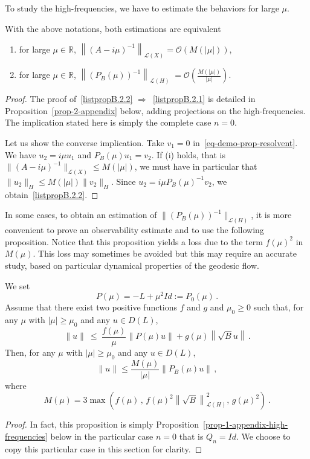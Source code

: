 \documentclass[10pt]{amsart}
\theoremstyle{definition}\newtheorem{defi}[theo]{Definition}\newtheorem{rema}[theo]{Remark}\newtheorem{exam}[theo]{Example}\newtheorem{exem}[theo]{Example}\newtheorem{nota}[theo]{Notation}
\newcommand{\RR}{\mathbb{R}}
\newcommand{\Lc}{\mathcal{L}}
\newcommand{\Oc}{\mathcal{O}}
\newcommand*{\romanenumi}{\renewcommand*{\theenumi}{\roman{enumi}}}
\begin{document}
To study the high-frequencies, we have to estimate the behaviors for large $\mu$.

\begin{prop}\label{prop-estimP}
With the above notations, both estimations are equivalent
\begin{enumerate}\romanenumi
\item \label{listpropB.2.1}for large $\mu\in\RR$, $\left\|(A-i\mu)^{-1}\right\|_{\Lc(X)} = \Oc (M(|\mu|))$,
\item \label{listpropB.2.2}for large $\mu\in\RR$, $\left\|(P_B(\mu))^{-1}\right\|_{\Lc(H)}\;= \Oc(
\frac{M(|\mu|)}{|\mu|})$.
\end{enumerate}
\end{prop}
\begin{proof}
The proof of~\eqref{listpropB.2.2} $\Rightarrow$~\eqref{listpropB.2.1} is detailed in Proposition~\ref{prop-2-appendix} below, adding projections on the high-frequencies. The implication stated here is simply the complete case $n=0$.

Let us show the converse implication. Take $v_1=0$ in~\eqref{eq-demo-prop-resolvent}. We have $u_2=i\mu u_1$ and $P_B(\mu)u_1 = v_2$. If (i) holds, that is $\|(A - i\mu)^{-1}\|_{\Lc(X)}\leq M(|\mu|)$, we must have in particular that $\|u_2\|_{H}\leq M(|\mu|)\|v_2\|_{H}$. Since $u_2=i\mu P_B(\mu)^{-1} v_2$, we obtain~\eqref{listpropB.2.2}.
\end{proof}


In some cases, to obtain an estimation of $\|(P_B(\mu))^{-1}\|_{\Lc(H)}$, it is more convenient to prove an observability estimate and to use the following proposition. Notice that this proposition yields a loss due to the term $f(\mu)^2$ in $M(\mu)$. This loss may sometimes be avoided but this may require an accurate study, based on particular dynamical properties of the geodesic flow.

\begin{prop}\label{prop-1-appendix}
We set
\[
P(\mu)=-L+\mu^2 Id:=P_0(\mu)\,.
\]
Assume that there exist two positive functions $f$ and $g$ and $\mu_0\geq 0$ such that, for any $\mu$ with $|\mu|\geq \mu_0$ and any $u\in D(L)$,
\begin{equation}\label{hyp-appendix}
\|u\|~\leq~\frac{f(\mu)}\mu \|P(\mu)u\| + g(\mu) \left\|\sqrt{B} u\right\|\,.
\end{equation}
Then, for any $\mu$ with $|\mu|\geq \mu_0$ and any $u\in D(L)$,
\begin{equation}\label{result-prop-1-1}
\|u\|\leq \frac{M(\mu)}{|\mu|} \|P_{B}(\mu)u\|\,,
\end{equation}
where
\begin{equation}\label{result-prop-1-3}
M(\mu)= 3 \max \left({f(\mu)}\,,\,f(\mu)^2\left\|\sqrt{B}\right\|_{\Lc(H)}^2,\, g(\mu)^2\right)\,.
\end{equation}
\end{prop}
\begin{proof}
In fact, this proposition is simply Proposition~\ref{prop-1-appendix-high-frequencies} below in the particular case $n=0$ that is $Q_n=Id$. We choose to copy this particular case in this section for clarity.
\end{proof}
\end{document}
